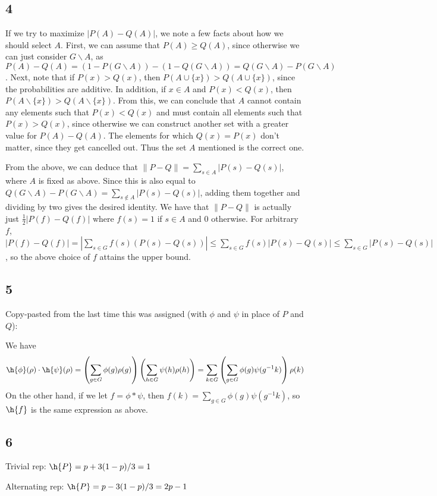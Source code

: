 \documentclass{article}
\begin{document}
\subsection*{4}
If we try to maximize $|P(A)-Q(A)|$, we note a few facts about how we should select $A$. First, we can assume that $P(A)\geq Q(A)$, since otherwise we can just consider $G\backslash A$, as $P(A)-Q(A)=(1-P(G\backslash A))-(1-Q(G\backslash A))=Q(G\backslash A)-P(G\backslash A)$. Next, note that if $P(x)>Q(x)$, then $P(A\cup\{x\})>Q(A\cup\{x\})$, since the probabilities are additive. In addition, if $x\in A$ and $P(x)<Q(x)$, then $P(A\backslash \{x\})>Q(A\backslash \{x\})$. From this, we can conclude that $A$ cannot contain any elements such that $P(x)<Q(x)$ and must contain all elements such that $P(x)>Q(x)$, since otherwise we can construct another set with a greater value for $P(A)-Q(A)$. The elements for which $Q(x)=P(x)$ don't matter, since they get cancelled out. Thus the set $A$ mentioned is the correct one.

From the above, we can deduce that $\|P-Q\|=\sum_{s\in A}|P(s)-Q(s)|$, where $A$ is fixed as above. Since this is also equal to $Q(G\backslash A)-P(G\backslash A)=\sum_{s\not\in A}|P(s)-Q(s)|$, adding them together and dividing by two gives the desired identity.
We have that $\|P-Q\|$ is actually just $\frac{1}{2}|P(f)-Q(f)|$ where $f(s)=1$ if $s\in A$ and $0$ otherwise. For arbitrary $f$, $|P(f)-Q(f)|=\left|\sum_{s\in G}f(s)(P(s)-Q(s))\right|\leq\sum_{s\in G}f(s)|P(s)-Q(s)|\leq\sum_{s\in G}|P(s)-Q(s)|$, so the above choice of $f$ attains the upper bound.
\subsection*{5}
Copy-pasted from the last time this was assigned (with $\phi$ and $\psi$ in place of $P$ and $Q$):

We have 
\[
    \h{\phi}(\rho)\cdot\h{\psi}(\rho)=\left(\sum_{g\in G}\phi(g)\rho(g)\right)\left(\sum_{h\in G}\psi(h)\rho(h)\right)=\sum_{k\in G}\left(\sum_{g\in G}\phi(g)\psi(g^{-1}k)\right)\rho(k)
\]
On the other hand, if we let $f=\phi*\psi$, then $f(k)=\sum_{g\in G}\phi(g)\psi(g^{-1}k)$, so $\h{f}$ is the same expression as above.
\subsection*{6}
Trivial rep: $\h{P}=p+3(1-p)/3=1$

\noindent Alternating rep: $\h{P}=p-3(1-p)/3=2p-1$
\end{document}
